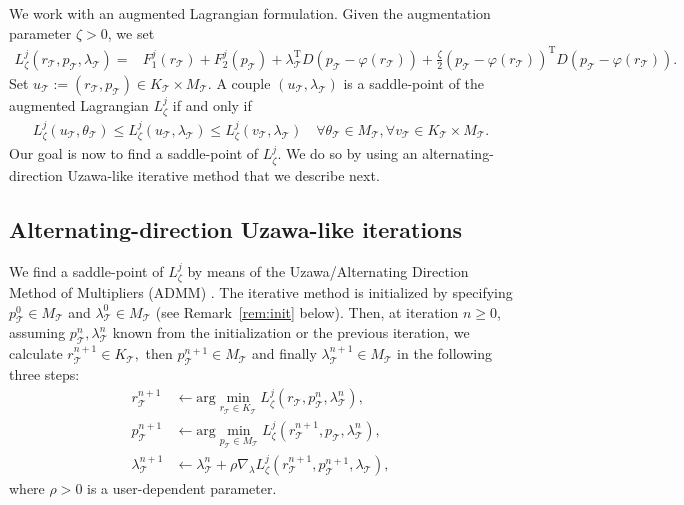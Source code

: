 \documentclass[a4paper,11pt]{article}
\theoremstyle{definition}
\theoremstyle{remark}
\numberwithin{equation}{section}
\newcommand{\disr}{r_\calT}
\newcommand{\disp}{p_\calT}
\newcommand{\disK}{K_\calT}
\newcommand{\disM}{M_\calT}
\newcommand{\disLamb}{\lambda_\calT}
\newcommand{\disu}{u_\calT}
\newcommand{\calT}{\mathcal{T}}
\newcommand{\tr}{^{\mathrm{T}}}
\begin{document}
We work with an augmented Lagrangian formulation. Given the augmentation parameter $\zeta>0$, we set
\begin{align}\label{equn:cost-nonlinear-ccoupling}
{L}^j_\zeta(\disr,\disp,\disLamb)=&F^j_1(\disr) + F^j_2(\disp) +  \disLamb\tr  D (\disp-\varphi(\disr)) +\frac{\zeta}{2} (\disp-\varphi(\disr))\tr D (\disp-\varphi(\disr)).
\end{align}
Set $\disu:=(\disr,\disp)\in \disK \times \disM.$ A couple $(\disu,\disLamb)$ is a saddle-point of the augmented Lagrangian ${L}^j_\zeta$ if and only if
\begin{align}\label{equn:saddle-point}
{L}^j_\zeta(\disu,\theta_\calT) \leq {L}^j_\zeta(\disu,\disLamb) \leq  {L}^j_\zeta(v_\calT,\disLamb)  \quad \forall \theta_\calT \in \disM,  \forall v_\calT \in \disK \times \disM.
\end{align}
Our goal is now to find a saddle-point of $L^j_\zeta$. We do so by using an alternating-direction Uzawa-like iterative method that we describe next.

\subsection{Alternating-direction Uzawa-like iterations}

We find a saddle-point of $L^j_\zeta$ by means of the Uzawa/Alternating Direction Method of Multipliers (ADMM)  \cite{Arrow:Hurwicz:Uzawa:1958,Fortin:Glowinski:1983}. 
The iterative method is initialized by specifying $\disp^0\in\disM$ and $\disLamb^0\in\disM$
(see Remark~\ref{rem:init} below). Then, at iteration $n\ge0$, assuming $\disp^n,\disLamb^n$ known from the initialization or the previous iteration, we calculate $\disr^{n+1}\in\disK,$ then $\disp^{n+1}\in\disM$ and finally $\disLamb^{n+1}\in\disM$ in the following three steps:
\begin{subequations} \label{eq:Uzawa} \begin{align}
\disr^{n+1} &\leftarrow \text{arg}\min_{\disr\in \disK}{L}^j_\zeta (\disr,\disp^n, \disLamb^n), \label{equn:opt-r}\\
\disp^{n+1} &\leftarrow \text{arg}\min_{\disp\in \disM}{L}^j_\zeta (\disr^{n+1},\disp, \disLamb^n), \label{equn:opt-p}\\
\disLamb^{n+1} &\leftarrow \disLamb^{n}+\rho  \nabla_\lambda{L}^j_\zeta(\disr^{n+1},\disp^{n+1}, \disLamb), \label{equn:opt-LM}
\end{align}\end{subequations}
where $\rho>0$ is a user-dependent parameter. 
\end{document}
